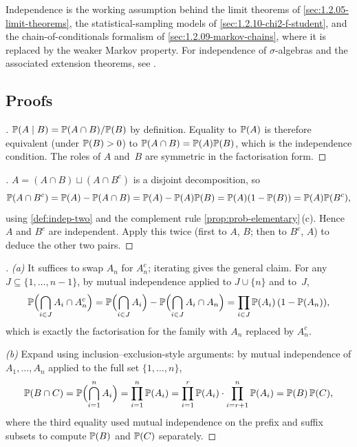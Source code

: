 \begin{remark}
Independence is the working assumption behind the limit theorems of
\cref{sec:1.2.05-limit-theorems}, the statistical-sampling models
of \cref{sec:1.2.10-chi2-f-student}, and the chain-of-conditionals
formalism of \cref{sec:1.2.09-markov-chains}, where it is replaced
by the weaker Markov property. For independence of $\sigma$-algebras
and the associated extension theorems, see \cite[Ch.~II,
\S~5]{Shiryaev1989}.
\end{remark}

\subsection*{Proofs}

\begin{proof}[]
$\mathbb{P}(A \mid B) = \mathbb{P}(A \cap B) / \mathbb{P}(B)$ by definition. Equality
to $\mathbb{P}(A)$ is therefore equivalent (under $\mathbb{P}(B) > 0$) to
$\mathbb{P}(A \cap B) = \mathbb{P}(A) \mathbb{P}(B)$, which is the independence
condition. The roles of $A$ and~$B$ are symmetric in the
factorisation form.
\end{proof}

\begin{proof}[]
$A = (A \cap B) \sqcup (A \cap B^c)$ is a disjoint decomposition, so
\[
  \mathbb{P}(A \cap B^c) = \mathbb{P}(A) - \mathbb{P}(A \cap B) = \mathbb{P}(A) - \mathbb{P}(A) \mathbb{P}(B) = \mathbb{P}(A) (1 - \mathbb{P}(B)) = \mathbb{P}(A) \mathbb{P}(B^c),
\]
using \cref{def:indep-two} and the complement rule
\cref{prop:prob-elementary}\,(c). Hence $A$ and $B^c$ are
independent. Apply this twice (first to $A$, $B$; then to
$B^c$, $A$) to deduce the other two pairs.
\end{proof}

\begin{proof}[]
\emph{(a)} It suffices to swap $A_n$ for $A_n^c$; iterating gives
the general claim. For any $J \subseteq \{1, \dots, n-1\}$, by
mutual independence applied to $J \cup \{n\}$ and to~$J$,
\[
  \mathbb{P}\Bigl(\bigcap_{i \in J} A_i \cap A_n^c\Bigr) = \mathbb{P}\Bigl(\bigcap_{i \in J} A_i\Bigr) - \mathbb{P}\Bigl(\bigcap_{i \in J} A_i \cap A_n\Bigr) = \prod_{i \in J} \mathbb{P}(A_i)\, (1 - \mathbb{P}(A_n)),
\]
which is exactly the factorisation for the family with $A_n$
replaced by $A_n^c$.

\emph{(b)} Expand using inclusion–exclusion-style arguments: by
mutual independence of $A_1, \dots, A_n$ applied to the full set
$\{1, \dots, n\}$,
\[
  \mathbb{P}(B \cap C) = \mathbb{P}\Bigl(\bigcap_{i=1}^{n} A_i\Bigr) = \prod_{i=1}^{n} \mathbb{P}(A_i) = \prod_{i=1}^{r} \mathbb{P}(A_i) \cdot \prod_{i=r+1}^{n} \mathbb{P}(A_i) = \mathbb{P}(B)\, \mathbb{P}(C),
\]
where the third equality used mutual independence on the prefix and
suffix subsets to compute $\mathbb{P}(B)$ and $\mathbb{P}(C)$ separately.
\end{proof}

